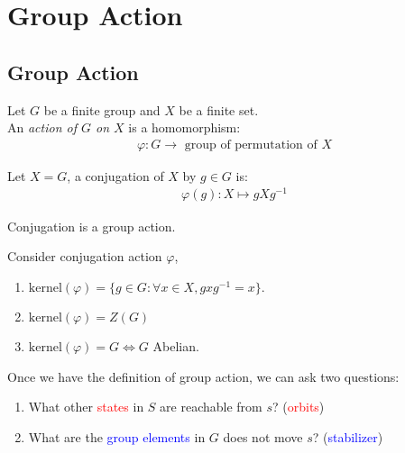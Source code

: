 \newpage
\section{Group Action} \label{sec:}
\subsection{Group Action} \label{sec:}

\begin{definition}
Let $G$ be a finite group and $X$ be a finite set.
\\ An \textit{action of $G$ on $X$} is a homomorphism:
\begin{align*}
    \varphi: G \to \text{ group of permutation of } X
\end{align*}
\end{definition}

\begin{definition}[Conjugation]
Let $X=G$, a conjugation of $X$ by $g \in G$ is:
\begin{align*}
    \varphi(g): X \mapsto gXg^{-1}
\end{align*}
\end{definition}

\begin{corollary}
Conjugation is a group action.
\end{corollary}

\begin{remark} Consider conjugation action $\varphi$,
\begin{enumerate}
    \item $\text{kernel}(\varphi) = \{ g \in G : \forall x \in X, gxg^{-1} = x \}$.
    \item $\text{kernel}(\varphi) = Z(G)$
    \item $\text{kernel}(\varphi) = G \iff G $ Abelian.
\end{enumerate}    
\end{remark}
\begin{observe}
    Once we have the definition of group action, we can ask two questions:
    \begin{enumerate}
    \item What other \textcolor{red}{states} in $S$ are reachable from $s$? (\textcolor{red}{orbits})
    \item What are the \textcolor{blue}{group elements} in $G$ does not move $s$? (\textcolor{blue}{stabilizer})
    \end{enumerate}
\end{observe}

